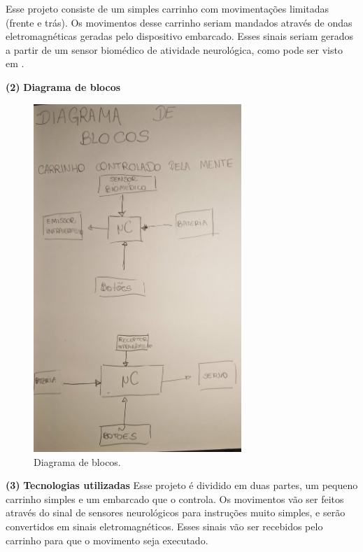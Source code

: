 \documentclass[11pt]{article}
\renewcommand\part[1]{\vspace{.10in}\textbf{(#1)}}
\newcommand\diagrama{\vspace{.10in}\textbf{Diagrama de blocos }}
\newcommand\componentes{\vspace{.10in}\textbf{Tecnologias utilizadas}}
\begin{document}
\RaggedRight Esse projeto consiste de um simples carrinho com movimentações limitadas (frente e trás). Os movimentos desse carrinho seriam mandados através de ondas eletromagnéticas geradas pelo dispositivo embarcado. Esses sinais seriam gerados a partir de um sensor biomédico de atividade neurológica, como pode ser visto em \cite{biomedic_sensor}. 

\raggedright
\part{2} \diagrama

\begin{figure}[H]
	\centering
	\includegraphics[width=0.7\textwidth]{fig2.jpg}
	\caption{Diagrama de blocos.}
\end{figure}

\raggedright
\part{3} \componentes
Esse projeto é dividido em duas partes, um pequeno carrinho simples e um embarcado que o controla. Os movimentos vão ser feitos através do sinal de sensores neurológicos para instruções muito simples, e serão convertidos em sinais eletromagnéticos. Esses sinais vão ser recebidos pelo carrinho para que o movimento seja executado.
\end{document}
